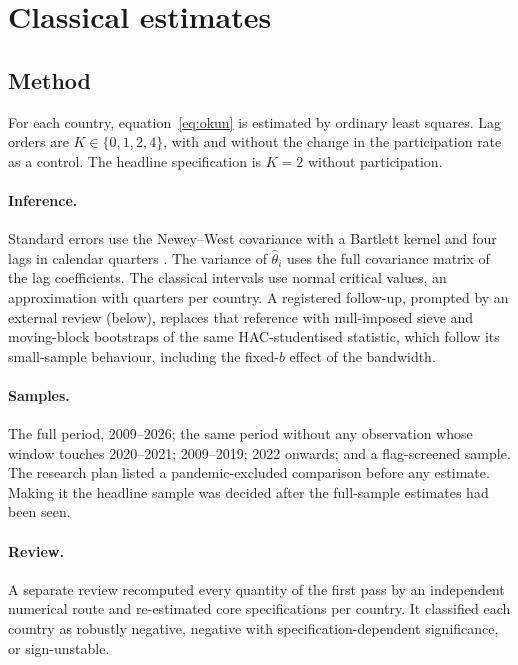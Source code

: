 \section{Classical estimates}\label{sec:classical}

\subsection{Method}

For each country, equation~\eqref{eq:okun} is estimated by ordinary least squares. Lag
orders are $K\in\{0,1,2,4\}$, with and without the change in the participation rate as a
control. The headline specification is $K=2$ without participation.

\paragraph{Inference.} Standard errors use the Newey--West covariance with a Bartlett
kernel and four lags in calendar quarters \citep{newey1987hac}. The variance of
$\hat\theta_i$ uses the full covariance matrix of the lag coefficients. The classical
intervals use normal critical values, an approximation with  quarters
per country. A registered follow-up, prompted by an external review (below), replaces that reference with null-imposed sieve and
moving-block bootstraps of the same HAC-studentised statistic, which follow its
small-sample behaviour, including the fixed-$b$ effect of the bandwidth.

\paragraph{Samples.} The full period, 2009--2026; the same period without any observation
whose window touches 2020--2021; 2009--2019; 2022 onwards; and a flag-screened sample. The
research plan listed a pandemic-excluded comparison before any estimate. Making it the
headline sample was decided after the full-sample estimates had been seen.

\paragraph{Review.} A separate review recomputed every quantity of the first pass by an
independent numerical route and re-estimated  core
specifications per country. It classified each country as robustly negative, negative
with specification-dependent significance, or sign-unstable.

